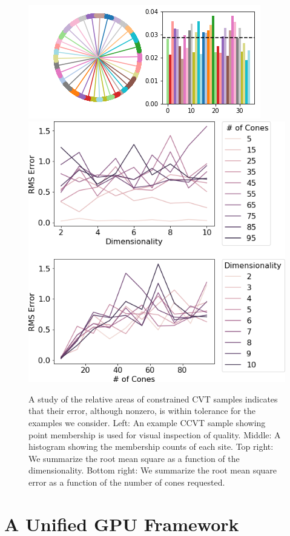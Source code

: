 \begin{figure}[t]
    \includegraphics[width=0.65\linewidth]{figs/chap7/cvt_study_35.png}
    \includegraphics[width=0.32\linewidth]{figs/chap7/scvt.png}
    \caption[Analysis of uniformity from CCVT samples]{A study of the relative areas of constrained CVT samples indicates that their error, although nonzero, is within tolerance for the examples we consider.
    Left: An example CCVT sample showing point membership is used for visual inspection of quality.
    Middle: A histogram showing the membership counts of each site.
    Top right: We summarize the root mean square as a function of the dimensionality.
    Bottom right: We summarize the root mean square error as a function of the number of cones requested.}
    \label{fig:cvt_study}
\end{figure}


\section{A Unified GPU Framework}
\label{sec:gpu_graphs}

